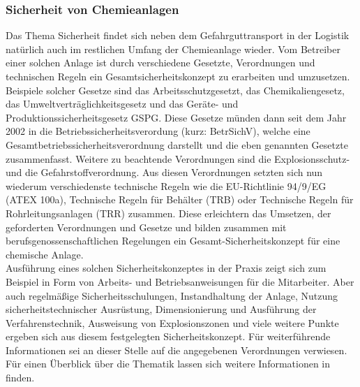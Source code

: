 \subsubsection{Sicherheit von Chemieanlagen}
Das Thema Sicherheit findet sich neben dem Gefahrguttransport in der Logistik natürlich auch im restlichen Umfang der Chemieanlage wieder. 
Vom Betreiber einer solchen Anlage ist durch verschiedene Gesetzte, Verordnungen und technischen Regeln ein Gesamtsicherheitskonzept zu erarbeiten und umzusetzen. Beispiele solcher Gesetze sind das Arbeitsschutzgesetzt, das Chemikaliengesetz, das Umweltverträglichkeitsgesetz und das Geräte- und Produktionssicherheitsgesetz GSPG. \linebreak 
Diese Gesetze münden dann seit dem Jahr 2002 in die Betriebssicherheitsverordung (kurz: BetrSichV), welche eine Gesamtbetriebssicherheitsverordnung darstellt und die eben genannten Gesetzte zusammenfasst. Weitere zu beachtende Verordnungen sind die Explosionsschutz- und die Gefahrstoffverordnung.\linebreak
Aus diesen Verordnungen setzten sich nun wiederum verschiedenste technische Regeln wie die EU-Richtlinie 94/9/EG (ATEX 100a), Technische Regeln für Behälter (TRB) oder Technische Regeln für Rohrleitungsanlagen (TRR) zusammen. Diese erleichtern das Umsetzen, der geforderten Verordnungen und Gesetze und bilden zusammen mit berufsgenossenschaftlichen Regelungen ein Gesamt-Sicherheitskonzept für eine chemische Anlage. \cite{Ignatowitz.2015}\\
Ausführung eines solchen Sicherheitskonzeptes in der Praxis zeigt sich zum Beispiel in Form von Arbeits- und Betriebsanweisungen für die Mitarbeiter. Aber auch regelmäßige Sicherheitsschulungen, Instandhaltung der Anlage, Nutzung sicherheitstechnischer Ausrüstung, Dimensionierung und Ausführung der Verfahrenstechnik, Ausweisung von Explosionszonen und viele weitere Punkte ergeben sich aus diesem festgelegten Sicherheitskonzept. Für weiterführende Informationen sei an dieser Stelle auf die angegebenen Verordnungen verwiesen. Für einen Überblick über die Thematik lassen sich weitere Informationen in \cite{Ignatowitz.2015} finden.

